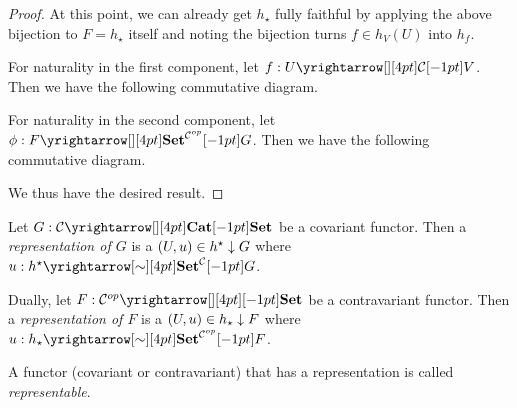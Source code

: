 \begin{proof}
  At this point, we can already get $h_\star$ fully faithful by
  applying the above bijection to $F = h_\star$ itself and noting
  the bijection turns $f \in h_V(U)$ into $h_f$. 

  For naturality in the first component,
  let $f : \map{U}{V}{\CC}{}$.
  Then we have the following commutative diagram. 
  \begin{figure}[H]
    \centering
  \end{figure}
  For naturality in the second component, 
  let $\phi : \map{F}{G}{\SET^{\CC\op}}{}$.
  Then we have the following commutative diagram.
  \begin{figure}[H]
    \centering
  \end{figure}
  We thus have the desired result. 
\end{proof}

\begin{dfn}
  
  Let $G : \map{\CC}{\SET}{\CAT}{}$ be a covariant functor. 
  Then a \emph{representation of $G$} is a $(U,u) \in h^\star\downarrow G$
  where $u : \map{h^\star}{G}{\SET^\CC}{\sim}$.

  Dually, let $F : \map{\CC\op}{\SET}{}{}$ be a contravariant functor. 
  Then a \emph{representation of $F$} is a $(U,u) \in h_\star\downarrow F$
  where $u : \map{h_\star}{F}{\SET^{\CC\op}}{\sim}$.

  A functor (covariant or contravariant) that has a representation is called 
  \emph{representable}.
\end{dfn}

